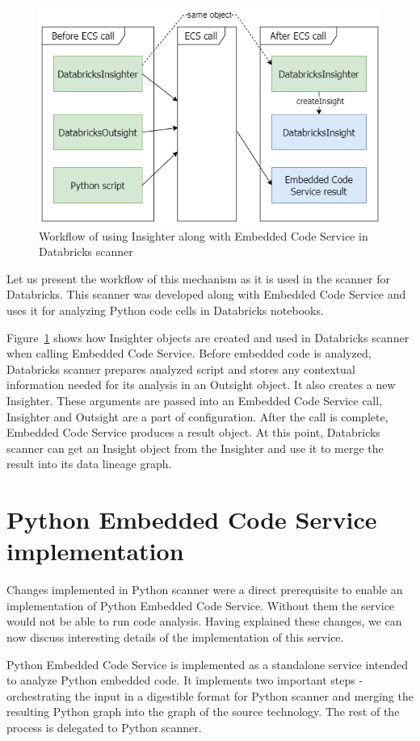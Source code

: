 \begin{figure}[ht]\centering
\includegraphics[width=1.0\textwidth]{img/insighter.png}
\caption{Workflow of using Insighter along with Embedded Code Service in Databricks scanner}
\label{fig:insighter}
\end{figure}

Let us present the workflow of this mechanism as it is used in the scanner for Databricks. This scanner was developed along with Embedded Code Service and uses it for analyzing Python code cells in Databricks notebooks.
\par
Figure~\ref{fig:insighter} shows how Insighter objects are created and used in Databricks scanner when calling Embedded Code Service. Before embedded code is analyzed, Databricks scanner prepares analyzed script and stores any contextual information needed for its analysis in an Outsight object. It also creates a new Insighter. These arguments are passed into an Embedded Code Service call, Insighter and Outsight are a part of configuration. After the call is complete, Embedded Code Service produces a result object. At this point, Databricks scanner can get an Insight object from the Insighter and use it to merge the result into its data lineage graph.

\section{Python Embedded Code Service implementation}

Changes implemented in Python scanner were a direct prerequisite to enable an implementation of Python Embedded Code Service. Without them the service would not be able to run code analysis. Having explained these changes, we can now discuss interesting details of the implementation of this service.
\par
Python Embedded Code Service is implemented as a standalone service intended to analyze Python embedded code. It implements two important steps - orchestrating the input in a digestible format for Python scanner and merging the resulting Python graph into the graph of the source technology. The rest of the process is delegated to Python scanner.

